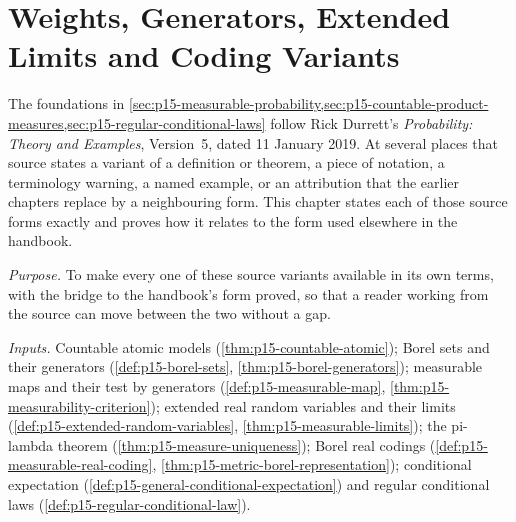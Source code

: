 \chapter{Weights, Generators, Extended Limits and Coding Variants}
\label{sec:p15-w02c-p15-002-source-variants}

The foundations in
\cref{sec:p15-measurable-probability,sec:p15-countable-product-measures,sec:p15-regular-conditional-laws}
follow Rick Durrett's \emph{Probability: Theory and Examples}, Version~5,
dated 11 January 2019. At several places that source states a variant of a
definition or theorem, a piece of notation, a terminology warning, a named
example, or an attribution that the earlier chapters replace by a
neighbouring form. This chapter states each of those source forms exactly
and proves how it relates to the form used elsewhere in the handbook.

\emph{Purpose.} To make every one of these source variants available in
its own terms, with the bridge to the handbook's form proved, so that a
reader working from the source can move between the two without a gap.

\emph{Inputs.} Countable atomic models (\cref{thm:p15-countable-atomic});
Borel sets and their generators (\cref{def:p15-borel-sets},
\cref{thm:p15-borel-generators}); measurable maps and their test by
generators (\cref{def:p15-measurable-map},
\cref{thm:p15-measurability-criterion}); extended real random variables
and their limits (\cref{def:p15-extended-random-variables},
\cref{thm:p15-measurable-limits}); the pi-lambda theorem
(\cref{thm:p15-measure-uniqueness}); Borel real codings
(\cref{def:p15-measurable-real-coding},
\cref{thm:p15-metric-borel-representation}); conditional expectation
(\cref{def:p15-general-conditional-expectation}) and regular conditional
laws (\cref{def:p15-regular-conditional-law}).

